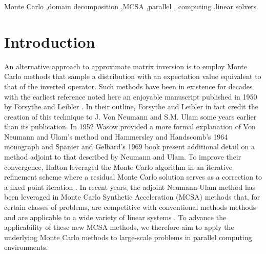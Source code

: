 \documentclass[preprint,11pt]{elsarticle}
\begin{document}
\begin{frontmatter}
\begin{keyword}
Monte Carlo \sep domain decomposition \sep MCSA \sep parallel \sep
computing \sep linear solvers
\end{keyword}

\end{frontmatter}

\section{Introduction}
\label{sec:intro}

An alternative approach to approximate matrix inversion is to employ Monte
Carlo methods that sample a distribution with an expectation value equivalent
to that of the inverted operator. Such methods have been in existence for
decades with the earliest reference noted here an enjoyable manuscript
published in 1950 by Forsythe and Leibler \cite{forsythe_matrix_1950}. In
their outline, Forsythe and Leibler in fact credit the creation of this
technique to J. Von Neumann and S.M. Ulam some years earlier than its
publication. In 1952 Wasow provided a more formal explanation of Von Neumann
and Ulam's method \cite{wasow_note_1952} and Hammersley and Handscomb's 1964
monograph \cite{hammersley_monte_1964} and Spanier and Gelbard's 1969 book
\cite{spanier_monte_1969} present additional detail on a method adjoint to
that described by Neumann and Ulam. To improve their convergence, Halton
leveraged the Monte Carlo algorithm in an iterative refinement scheme where a
residual Monte Carlo solution serves as a correction to a fixed point
iteration \cite{halton_sequential_1962}. In recent years, the adjoint
Neumann-Ulam method has been leveraged in Monte Carlo Synthetic Acceleration
(MCSA) methods that, for certain classes of problems, are competitive with
conventional methods methods and are applicable to a wide variety of linear
systems \cite{evans_monte_2009,evans_monte_2014}. To advance the applicability
of these new MCSA methods, we therefore aim to apply the underlying Monte
Carlo methods to large-scale problems in parallel computing environments.
\end{document}
